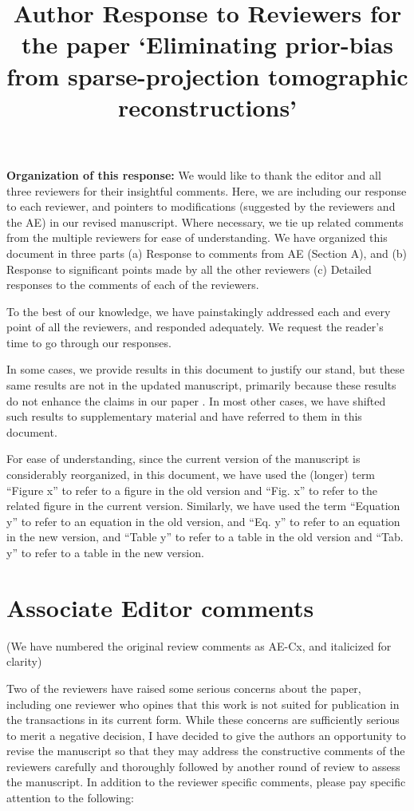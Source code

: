 \documentclass{article}
\title{Author Response to Reviewers for the paper `Eliminating prior-bias from sparse-projection tomographic reconstructions'}
\begin{document}
\maketitle

\textbf{Organization of this response:} We would like to thank the editor and all three reviewers for their insightful comments. Here, we are including our response to each reviewer, and pointers to modifications (suggested by the reviewers and the AE) in our revised manuscript.  Where necessary, we tie up related comments from the multiple reviewers for ease of understanding.  We have organized this document in three parts (a) Response to comments from AE (Section A), and (b) Response to significant points made by all the other reviewers (c) Detailed  responses to the comments of each of the reviewers.

To the best of our knowledge, we have painstakingly addressed each and every point of all the reviewers, and responded adequately.  We request the reader's time to go through our responses.

In some cases, we provide results in this document to justify our stand, but these same results are not in the updated manuscript, primarily because these results do not enhance the claims in our paper . In most other cases, we have shifted such results to supplementary material and have referred to them in this document.

For ease of understanding, since the current version of the manuscript is considerably reorganized, in this document, we have used the (longer) term ``Figure x'' to refer to a figure in the old version and ``Fig. x'' to refer to the related figure in the current version. Similarly, we have used the term ``Equation y'' to refer to an equation in the old version, and ``Eq. y'' to refer to an equation in the new version, and ``Table y'' to refer to a table in the old version and ``Tab. y'' to refer to a table in the new version. 

\section{Associate Editor comments}
(We have numbered the original review comments as AE-Cx, and italicized for clarity)

Two of the reviewers have raised some serious concerns about the paper, including one reviewer who opines that this work is not suited for publication in the transactions in its current form. While these concerns are sufficiently serious to merit a negative decision, I have decided to give the authors an opportunity to revise the manuscript so that they may address the constructive comments of the reviewers carefully and thoroughly followed by another round of review to assess the manuscript. In addition to the reviewer specific comments, please pay specific attention to the following:\\
\end{document}
